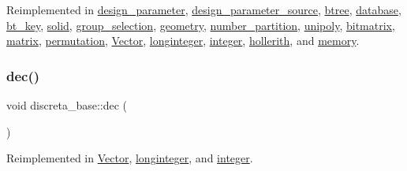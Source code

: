 Reimplemented in \mbox{\hyperlink{classdesign__parameter_a4e0434c6fd0d805543d730b40fc8e01f}{design\+\_\+parameter}}, \mbox{\hyperlink{classdesign__parameter__source_a1fd0910addc02ffe117ec08d0f93f8a6}{design\+\_\+parameter\+\_\+source}}, \mbox{\hyperlink{classbtree_ae990f68198985c1c7c7a36a65f091ac7}{btree}}, \mbox{\hyperlink{classdatabase_a7402d11485a917293586dcf082f506b2}{database}}, \mbox{\hyperlink{classbt__key_ae97899364f826bc3d16cce36b9c8e4f7}{bt\+\_\+key}}, \mbox{\hyperlink{classsolid_a7f35a904885ef626d1a74663fe2cad62}{solid}}, \mbox{\hyperlink{classgroup__selection_a02a5e69978de662af0e8372a4f0b23a8}{group\+\_\+selection}}, \mbox{\hyperlink{classgeometry_a3c35255b73911b76347ae549edfb0050}{geometry}}, \mbox{\hyperlink{classnumber__partition_acf25157ca8486f55d86d7ea05fa033be}{number\+\_\+partition}}, \mbox{\hyperlink{classunipoly_aa856d320a499748a0f3345ab45e51910}{unipoly}}, \mbox{\hyperlink{classbitmatrix_ac97adfe8348d9fe6ef19447b7611bbea}{bitmatrix}}, \mbox{\hyperlink{classmatrix_a6a47f82604adaa39b21f6bfe6da9e898}{matrix}}, \mbox{\hyperlink{classpermutation_aed08e7ec26ec8ba0ed8c656a819ce43a}{permutation}}, \mbox{\hyperlink{class_vector_af657307f3d344c8cef5d633335a5f484}{Vector}}, \mbox{\hyperlink{classlonginteger_ae894d5c96d74d0c19a09527956a14493}{longinteger}}, \mbox{\hyperlink{classinteger_a0258f5ab80826ddd4d845a52a6c450b2}{integer}}, \mbox{\hyperlink{classhollerith_aca74f6b673481c6e2b3b553171215f9c}{hollerith}}, and \mbox{\hyperlink{classmemory_a4fe4349915769808c6ff3cf83c661bf0}{memory}}.

\mbox{\label{classdiscreta__base_a11449a5cfa7dc5f5600e012517af6f0f}} 
\subsubsection{\texorpdfstring{dec()}{dec()}}
{\footnotesize\ttfamily void discreta\+\_\+base\+::dec (\begin{DoxyParamCaption}{ }\end{DoxyParamCaption})\hspace{0.3cm}{\ttfamily [virtual]}}



Reimplemented in \mbox{\hyperlink{class_vector_ac2c2f8a845000951b008bbe833be3fd4}{Vector}}, \mbox{\hyperlink{classlonginteger_a99be1d0bdcae0dcce47d8d0a09612edf}{longinteger}}, and \mbox{\hyperlink{classinteger_a6b744350afb55f82d25e55bb6b1027b2}{integer}}.

